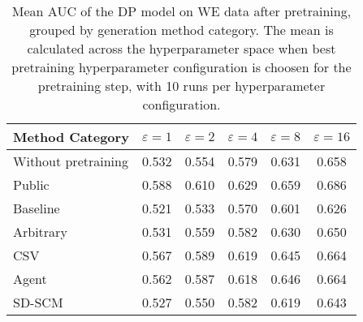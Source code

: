 \begin{table}[h!]
    \centering
    \caption{Mean AUC of the DP model on WE data after pretraining, grouped by generation method category. The mean is calculated across the hyperparameter space when best pretraining hyperparameter configuration is choosen for the pretraining step, with 10 runs per hyperparameter configuration.}
    \label{tab:epsilon_comparison}
    \begin{tabular}{lccccc}
    \toprule
    Method Category & $\varepsilon=1$ & $\varepsilon=2$ & $\varepsilon=4$ & $\varepsilon=8$ & $\varepsilon=16$ \\
    \midrule
    Without pretraining & 0.532 & 0.554 & 0.579 & 0.631 & \cellcolor{bronze!30}0.658 \\
    \arrayrulecolor{black!50!}\midrule
    Public & \cellcolor{gold!30}0.588 & \cellcolor{gold!30}0.610 & \cellcolor{gold!30}0.629 & \cellcolor{gold!30}0.659 & \cellcolor{gold!30}0.686 \\
    \arrayrulecolor{black!50!}\midrule
    Baseline & 0.521 & 0.533 & 0.570 & 0.601 & 0.626 \\
    \arrayrulecolor{black!50!}\midrule
    Arbitrary & 0.531 & 0.559 & 0.582 & 0.630 & 0.650 \\
    \arrayrulecolor{black!50!}\midrule
    CSV & \cellcolor{silver!30}0.567 & \cellcolor{silver!30}0.589 & \cellcolor{silver!30}0.619 & \cellcolor{bronze!30}0.645 & \cellcolor{silver!30}0.664 \\
    Agent & \cellcolor{bronze!30}0.562 & \cellcolor{bronze!30}0.587 & \cellcolor{bronze!30}0.618 & \cellcolor{silver!30}0.646 & \cellcolor{silver!30}0.664 \\
    SD-SCM & 0.527 & 0.550 & 0.582 & 0.619 & 0.643 \\
    \bottomrule
    \end{tabular}
\end{table}